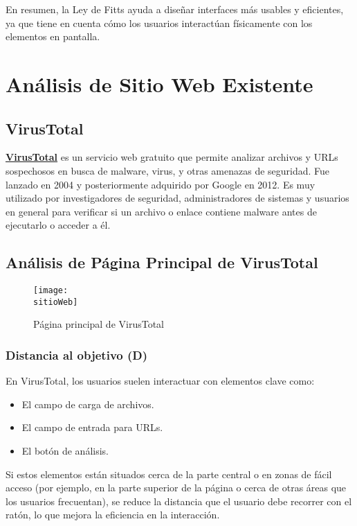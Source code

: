 	En resumen, la Ley de Fitts ayuda a diseñar interfaces más usables y
	eficientes, ya que tiene en cuenta cómo los usuarios interactúan
	físicamente con los elementos en pantalla.

	\section{Análisis de Sitio Web Existente}

	\subsection{VirusTotal}

	\textbf{\href{https://www.virustotal.com/gui/home/upload}{VirusTotal}}
	es un servicio web gratuito que permite analizar archivos y URLs sospechosos
	en busca de malware, virus, y otras amenazas de seguridad. Fue
	lanzado en 2004 y posteriormente adquirido por Google en 2012. Es
	muy utilizado por investigadores de seguridad, administradores de sistemas
	y usuarios en general para verificar si un archivo o enlace contiene
	malware antes de ejecutarlo o acceder a él.

	\subsection{Análisis de Página Principal de VirusTotal}

	\begin{figure}
		\centering
		\texttt{[image: \\sitioWeb]}
		\caption{Página principal de VirusTotal}
	\end{figure}

	\subsubsection{Distancia al objetivo (D)}

	En VirusTotal, los usuarios suelen interactuar con elementos clave como:

	\begin{itemize}
		\item El campo de carga de archivos.

		\item El campo de entrada para URLs.

		\item El botón de análisis.
	\end{itemize}

	Si estos elementos están situados cerca de la parte central o en
	zonas de fácil acceso (por ejemplo, en la parte superior de la
	página o cerca de otras áreas que los usuarios frecuentan), se
	reduce la distancia que el usuario debe recorrer con el ratón, lo que
	mejora la eficiencia en la interacción.

